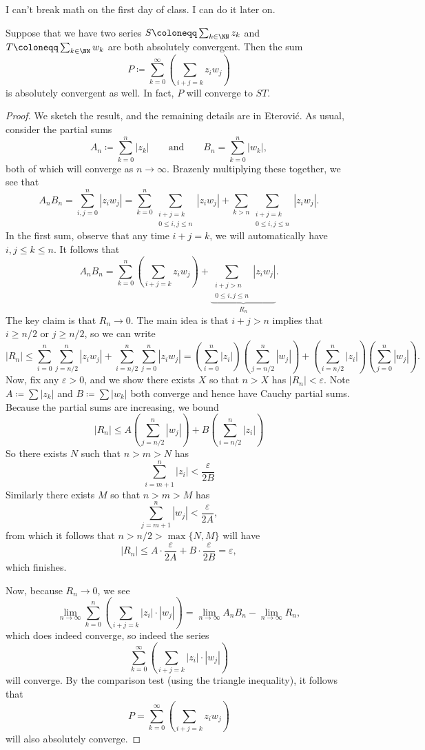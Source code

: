 \begin{quot}
	I can't break math on the first day of class. I can do it later on.
\end{quot}
\begin{lemma}
	Suppose that we have two series $S\coloneqq\sum_{k\in\NN}z_k$ and $T\coloneqq\sum_{k\in\NN}w_k$ are both absolutely convergent. Then the sum
	\[P\coloneqq\sum_{k=0}^\infty\left(\sum_{i+j=k}z_iw_j\right)\]
	is absolutely convergent as well. In fact, $P$ will converge to $ST$.
\end{lemma}
\begin{proof}
	We sketch the result, and the remaining details are in Eterovi\'c. As usual, consider the partial sums
	\[A_n\coloneqq\sum_{k=0}^n|z_k|\qquad\text{and}\qquad B_n=\sum_{k=0}^n|w_k|,\]
	both of which will converge as $n\to\infty$. Brazenly multiplying these together, we see that
	\[A_nB_n=\sum_{i,j=0}^n|z_iw_j|=\sum_{k=0}^n\sum_{\substack{i+j=k\\0\le i,j\le n}}|z_iw_j|+\sum_{k>n}\sum_{\substack{i+j=k\\0\le i,j\le n}}|z_iw_j|.\]
	In the first sum, observe that any time $i+j=k$, we will automatically have $i,j\le k\le n$. It follows that
	\[A_nB_n=\sum_{k=0}^n\left(\sum_{i+j=k}z_iw_j\right)+\underbrace{\sum_{\substack{i+j>n\\0\le i,j\le n}}|z_iw_j|}_{R_n}.\]
	The key claim is that $R_n\to0$. The main idea is that $i+j>n$ implies that $i\ge n/2$ or $j\ge n/2$, so we can write
	\[|R_n|\le\sum_{i=0}^n\sum_{j=n/2}^n|z_iw_j|+\sum_{i=n/2}^n\sum_{j=0}^n|z_iw_j|=\left(\sum_{i=0}^n|z_i|\right)\left(\sum_{j=n/2}^n|w_j|\right)+\left(\sum_{i=n/2}^n|z_i|\right)\left(\sum_{j=0}^n|w_j|\right).\]
	Now, fix any $\varepsilon>0$, and we show there exists $X$ so that $n>X$ has $|R_n|<\varepsilon$. Note $A\coloneqq\sum|z_k|$ and $B\coloneqq\sum|w_k|$ both converge and hence have Cauchy partial sums. Because the partial sums are increasing, we bound
	\[|R_n|\le A\left(\sum_{j=n/2}^n|w_j|\right)+B\left(\sum_{i=n/2}^n|z_i|\right)\]
	So there exists $N$ such that $n>m>N$ has
	\[\sum_{i=m+1}^n|z_i|<\frac\varepsilon {2B}\]
	Similarly there exists $M$ so that $n>m>M$ has
	\[\sum_{j=m+1}^n|w_j|<\frac\varepsilon {2A},\]
	from which it follows that $n>n/2>\max\{N,M\}$ will have
	\[|R_n|\le A\cdot\frac\varepsilon {2A}+B\cdot\frac\varepsilon {2B}=\varepsilon,\]
	which finishes.

	Now, because $R_n\to0$, we see
	\[\lim_{n\to\infty}\sum_{k=0}^n\left(\sum_{i+j=k}|z_i|\cdot|w_j|\right)=\lim_{n\to\infty}A_nB_n-\lim_{n\to\infty}R_n,\]
	which does indeed converge, so indeed the series
	\[\sum_{k=0}^\infty\left(\sum_{i+j=k}|z_i|\cdot|w_j|\right)\]
	will converge. By the comparison test (using the triangle inequality), it follows that
	\[P=\sum_{k=0}^\infty\left(\sum_{i+j=k}z_iw_j\right)\]
	will also absolutely converge.


\end{proof}
